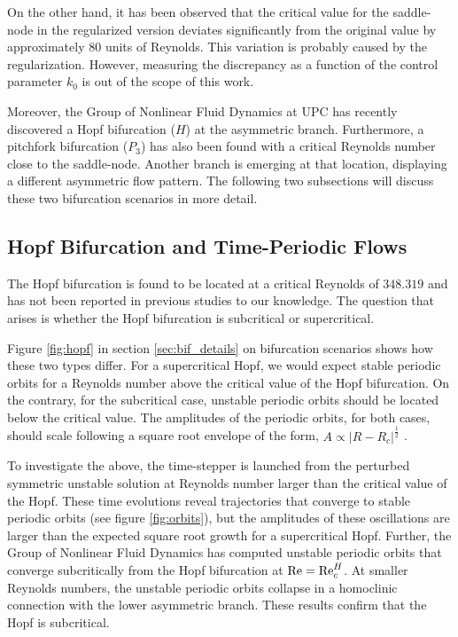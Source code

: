On the other hand, it has been observed that the critical value for the
saddle-node in the regularized version deviates significantly from the original
value by approximately $80$ units of Reynolds. This variation is probably
caused by the regularization. However, measuring the discrepancy as a function
of the control parameter $k_0$ is out of the scope of this work.

Moreover, the Group of Nonlinear Fluid Dynamics at UPC has recently discovered
a Hopf bifurcation ($H$) at the asymmetric branch. Furthermore, a pitchfork
bifurcation ($P_3$) has also been found with a critical Reynolds number close
to the saddle-node. Another branch is emerging at that location, displaying a
different asymmetric flow pattern. The following two subsections will discuss
these two bifurcation scenarios in more detail.

\subsection{Hopf Bifurcation and Time-Periodic Flows}

The Hopf bifurcation is found to be located at a critical Reynolds of $348.319$
and has not been reported in previous studies to our knowledge. The question
that arises is whether the Hopf bifurcation is subcritical or
supercritical. 

Figure \ref{fig:hopf} in section \ref{sec:bif_details} on bifurcation scenarios
shows how these two types differ. For a supercritical Hopf, we would expect
stable periodic orbits for a Reynolds number above the critical value of the
Hopf bifurcation. On the contrary, for the subcritical case, unstable periodic
orbits should be located below the critical value. The amplitudes of the
periodic orbits, for both cases, should scale following a square root envelope
of the form, $A \propto \lvert R - R_c \rvert^{\frac{1}{2}}$
\citep{kuznetsov2004}. 

To investigate the above, the time-stepper is launched from the perturbed
symmetric unstable solution at Reynolds number larger than the critical value
of the Hopf. These time evolutions reveal trajectories that converge to stable
periodic orbits (see figure \ref{fig:orbits}), but the amplitudes of these
oscillations are larger than the expected square root growth for a
supercritical Hopf. Further, the Group of Nonlinear Fluid Dynamics has computed
unstable periodic orbits that converge subcritically from the Hopf bifurcation
at $\mathrm{Re} = \mathrm{Re}_c^H$. At smaller Reynolds numbers, the unstable periodic orbits
collapse in a homoclinic connection with the lower asymmetric branch. These
results confirm that the Hopf is subcritical.

